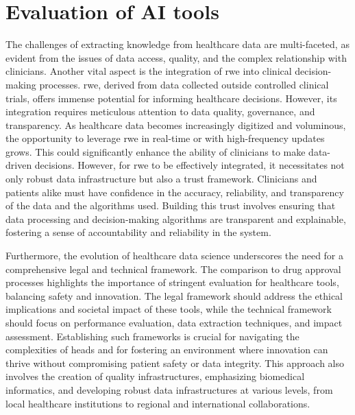 \section{Evaluation of AI tools}
The challenges of extracting knowledge from healthcare data are multi-faceted, as evident from the issues of data access, quality, and the complex relationship with clinicians. Another vital aspect is the integration of \ac{rwe} into clinical decision-making processes. \ac{rwe}, derived from data collected outside controlled clinical trials, offers immense potential for informing healthcare decisions. However, its integration requires meticulous attention to data quality, governance, and transparency. As healthcare data becomes increasingly digitized and voluminous, the opportunity to leverage \ac{rwe} in real-time or with high-frequency updates grows. This could significantly enhance the ability of clinicians to make data-driven decisions. However, for \ac{rwe} to be effectively integrated, it necessitates not only robust data infrastructure but also a trust framework. Clinicians and patients alike must have confidence in the accuracy, reliability, and transparency of the data and the algorithms used. Building this trust involves ensuring that data processing and decision-making algorithms are transparent and explainable, fostering a sense of accountability and reliability in the system.

Furthermore, the evolution of healthcare data science underscores the need for a comprehensive legal and technical framework. The comparison to drug approval processes highlights the importance of stringent evaluation for healthcare tools, balancing safety and innovation. The legal framework should address the ethical implications and societal impact of these tools, while the technical framework should focus on performance evaluation, data extraction techniques, and impact assessment. Establishing such frameworks is crucial for navigating the complexities of \ac{heads} and for fostering an environment where innovation can thrive without compromising patient safety or data integrity. This approach also involves the creation of quality infrastructures, emphasizing biomedical informatics, and developing robust data infrastructures at various levels, from local healthcare institutions to regional and international collaborations.

